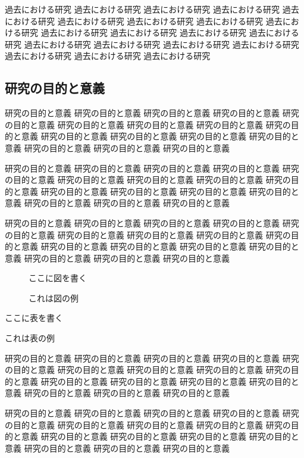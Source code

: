 \documentclass[12pt,dvipdfmx]{jarticle} %
\begin{document}
過去における研究 過去における研究 過去における研究 過去における研究 
過去における研究 過去における研究 過去における研究 過去における研究 
過去における研究 過去における研究 過去における研究 過去における研究 
過去における研究 過去における研究 過去における研究 過去における研究 
過去における研究 過去における研究 過去における研究 過去における研究 

\subsection{研究の目的と意義}

研究の目的と意義 研究の目的と意義 研究の目的と意義 研究の目的と意義 
研究の目的と意義 研究の目的と意義 研究の目的と意義 研究の目的と意義 
研究の目的と意義 研究の目的と意義 研究の目的と意義 研究の目的と意義 
研究の目的と意義 研究の目的と意義 研究の目的と意義 研究の目的と意義 

研究の目的と意義 研究の目的と意義 研究の目的と意義 研究の目的と意義 
研究の目的と意義 研究の目的と意義 研究の目的と意義 研究の目的と意義 
研究の目的と意義 研究の目的と意義 研究の目的と意義 研究の目的と意義 
研究の目的と意義 研究の目的と意義 研究の目的と意義 研究の目的と意義 

研究の目的と意義 研究の目的と意義 研究の目的と意義 研究の目的と意義 
研究の目的と意義 研究の目的と意義 研究の目的と意義 研究の目的と意義 
研究の目的と意義 研究の目的と意義 研究の目的と意義 研究の目的と意義 
研究の目的と意義 研究の目的と意義 研究の目的と意義 研究の目的と意義 

\begin{figure}
\centerline{ここに図を書く}
\caption{これは図の例}
\end{figure}

\begin{table}
\centerline{ここに表を書く}
\caption{これは表の例}
\end{table}

研究の目的と意義 研究の目的と意義 研究の目的と意義 研究の目的と意義 
研究の目的と意義 研究の目的と意義 研究の目的と意義 研究の目的と意義 
研究の目的と意義 研究の目的と意義 研究の目的と意義 研究の目的と意義 
研究の目的と意義 研究の目的と意義 研究の目的と意義 研究の目的と意義 

研究の目的と意義 研究の目的と意義 研究の目的と意義 研究の目的と意義 
研究の目的と意義 研究の目的と意義 研究の目的と意義 研究の目的と意義 
研究の目的と意義 研究の目的と意義 研究の目的と意義 研究の目的と意義 
研究の目的と意義 研究の目的と意義 研究の目的と意義 研究の目的と意義 
\end{document}
